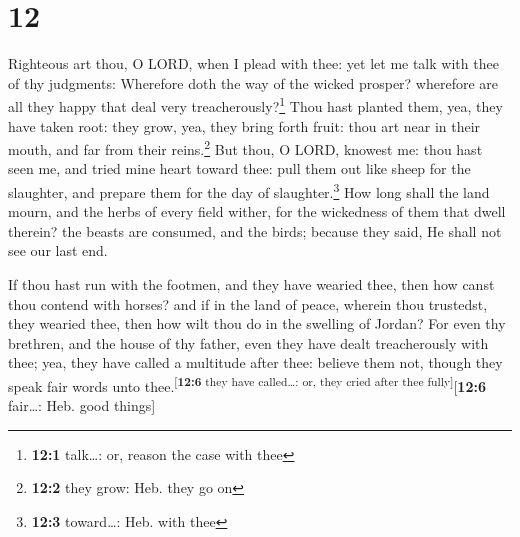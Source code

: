 \hypertarget{section-11}{%
\section{12}\label{section-11}}

 Righteous art thou, O LORD, when I plead with thee: yet
let me talk with thee of thy judgments: Wherefore doth the way of the
wicked prosper? wherefore are all they happy that deal very
treacherously?\footnote{\textbf{12:1} talk\ldots: or, reason the case
  with thee}  Thou hast planted them, yea, they have taken
root: they grow, yea, they bring forth fruit: thou art near in their
mouth, and far from their reins.\footnote{\textbf{12:2} they grow: Heb.
  they go on}  But thou, O LORD, knowest me: thou hast
seen me, and tried mine heart toward thee: pull them out like sheep for
the slaughter, and prepare them for the day of slaughter.\footnote{\textbf{12:3}
  toward\ldots: Heb. with thee}  How long shall the land
mourn, and the herbs of every field wither, for the wickedness of them
that dwell therein? the beasts are consumed, and the birds; because they
said, He shall not see our last end.

 If thou hast run with the footmen, and they have wearied
thee, then how canst thou contend with horses? and if in the land of
peace, wherein thou trustedst, they wearied thee, then how wilt thou do
in the swelling of Jordan?  For even thy brethren, and the
house of thy father, even they have dealt treacherously with thee; yea,
they have called a multitude after thee: believe them not, though they
speak fair words unto thee.\textsuperscript{{[}\textbf{12:6} they have
called\ldots: or, they cried after thee fully{]}}{[}\textbf{12:6}
fair\ldots: Heb. good things{]}

